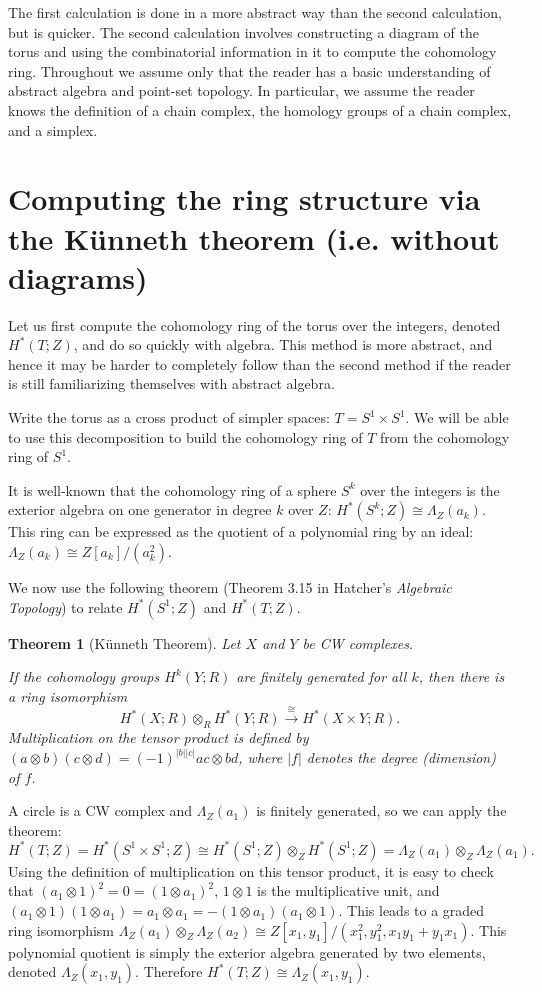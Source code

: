 \documentclass[12pt,a4paper]{article}
\newtheorem{theorem}{Theorem}
\begin{document}
The first calculation is done in a more abstract way than the second calculation, but is quicker. The second calculation involves constructing a diagram of the torus and using the combinatorial information in it to compute the cohomology ring. Throughout we assume only that the reader has a basic understanding of abstract algebra and point-set topology. In particular, we assume the reader knows the definition of a chain complex, the homology groups of a chain complex, and a simplex.

\section*{Computing the ring structure via the K\"unneth theorem (i.e. without diagrams)}

Let us first compute the cohomology ring of the torus over the integers, denoted $H^*(T;Z)$, and do so quickly with algebra. This method is more abstract, and hence it may be harder to completely follow than the second method if the reader is still familiarizing themselves with abstract algebra.

Write the torus as a cross product of simpler spaces: $T = S^1 \times S^1$. We will be able to use this decomposition to build the cohomology ring of $T$ from the cohomology ring of $S^1$.

It is well-known that the cohomology ring of a sphere $S^k$ over the integers is the exterior algebra on one generator in degree $k$ over $Z$: $H^*(S^k;Z) \cong \Lambda_Z(a_k)$. This ring can be expressed as the quotient of a polynomial ring by an ideal:  $\Lambda_Z(a_k) \cong Z[a_k]/(a_k^2)$.

We now use the following theorem (Theorem 3.15 in Hatcher's \emph{Algebraic Topology}) to relate $H^*(S^1;Z)$ and $H^*(T;Z)$.

\begin{theorem}[K\"unneth Theorem]
  Let $X$ and $Y$ be CW complexes. 

  If the cohomology groups $H^k(Y;R)$ are finitely generated for all $k$, then there is a ring isomorphism
  \[
  H^*(X;R) \otimes_R H^*(Y;R) \overset{\cong}{\rightarrow} H^*(X \times Y ; R).
  \]
  Multiplication on the tensor product is defined by $(a \otimes b)(c \otimes d) = (-1)^{|b||c|}ac \otimes bd$, where $| f |$ denotes the degree (dimension) of $f$.
\end{theorem}

A circle is a CW complex and $\Lambda_Z(a_1)$ is finitely generated, so we can apply the theorem:
\[
H^*(T;Z) = H^*(S^1 \times S^1;Z) \cong H^*(S^1;Z) \otimes_Z H^*(S^1;Z) = \Lambda_Z(a_1) \otimes_Z \Lambda_Z(a_1).
\]
Using the definition of multiplication on this tensor product, it is easy to check that $(a_1 \otimes 1)^2 = 0 = (1 \otimes a_1)^2$, $1 \otimes 1$ is the multiplicative unit, and $(a_1 \otimes 1)(1 \otimes a_1) = a_1 \otimes a_1 = -(1 \otimes a_1)(a_1 \otimes 1)$. This leads to a graded ring isomorphism $\Lambda_Z(a_1) \otimes_Z \Lambda_Z(a_2) \cong Z[x_1,y_1]/(x_1^2,y_1^2,x_1y_1 + y_1x_1)$. This polynomial quotient is simply the exterior algebra generated by two elements, denoted $\Lambda_Z(x_1,y_1)$. Therefore $H^*(T;Z) \cong \Lambda_Z(x_1,y_1)$.
\end{document}
